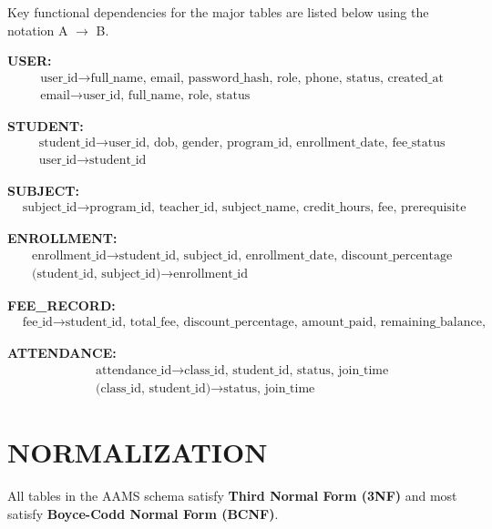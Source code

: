\documentclass[12pt,a4paper]{report}
\begin{document}
Key functional dependencies for the major tables are listed below using the notation A $\rightarrow$ B.

\textbf{USER:}
\begin{align*}
&\text{user\_id} \rightarrow \text{full\_name, email, password\_hash, role, phone, status, created\_at}\\
&\text{email} \rightarrow \text{user\_id, full\_name, role, status}
\end{align*}

\textbf{STUDENT:}
\begin{align*}
&\text{student\_id} \rightarrow \text{user\_id, dob, gender, program\_id, enrollment\_date, fee\_status}\\
&\text{user\_id} \rightarrow \text{student\_id}
\end{align*}

\textbf{SUBJECT:}
\begin{align*}
&\text{subject\_id} \rightarrow \text{program\_id, teacher\_id, subject\_name, credit\_hours, fee, prerequisite}
\end{align*}

\textbf{ENROLLMENT:}
\begin{align*}
&\text{enrollment\_id} \rightarrow \text{student\_id, subject\_id, enrollment\_date, discount\_percentage}\\
&\text{(student\_id, subject\_id)} \rightarrow \text{enrollment\_id}
\end{align*}

\textbf{FEE\_RECORD:}
\begin{align*}
&\text{fee\_id} \rightarrow \text{student\_id, total\_fee, discount\_percentage, amount\_paid, remaining\_balance, due\_date, payment\_status}
\end{align*}

\textbf{ATTENDANCE:}
\begin{align*}
&\text{attendance\_id} \rightarrow \text{class\_id, student\_id, status, join\_time}\\
&\text{(class\_id, student\_id)} \rightarrow \text{status, join\_time}
\end{align*}

\section{NORMALIZATION}

All tables in the AAMS schema satisfy \textbf{Third Normal Form (3NF)} and most satisfy \textbf{Boyce-Codd Normal Form (BCNF)}.
\end{document}
